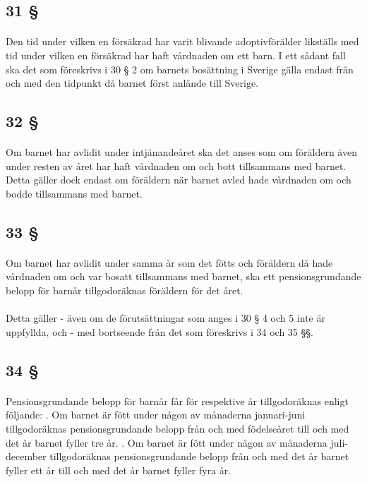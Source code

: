 \documentclass[a4paper,notitlepage,openany,10pt]{book}
\begin{document}
\subsection*{31 §}
\paragraph*{}
Den tid under vilken en försäkrad har varit blivande adoptivförälder likställs med tid under vilken en försäkrad har haft vårdnaden om ett barn. I ett sådant fall ska det som föreskrivs i 30 § 2 om barnets bosättning i Sverige gälla endast från och med den tidpunkt då barnet först anlände till Sverige.
\subsection*{32 §}
\paragraph*{}
Om barnet har avlidit under intjänandeåret ska det anses som om föräldern även under resten av året har haft vårdnaden om och bott tillsammans med barnet. Detta gäller dock endast om föräldern när barnet avled hade vårdnaden om och bodde tillsammans med barnet.
\subsection*{33 §}
\paragraph*{}
Om barnet har avlidit under samma år som det fötts och föräldern då hade vårdnaden om och var bosatt tillsammans med barnet, ska ett pensionsgrundande belopp för barnår tillgodoräknas föräldern för det året.
\paragraph*{}
Detta gäller
\newline - även om de förutsättningar som anges i 30 § 4 och 5 inte är uppfyllda, och
\newline - med bortseende från det som föreskrivs i 34 och 35 §§.
\subsection*{34 §}
\paragraph*{}
Pensionsgrundande belopp för barnår får för respektive år tillgodoräknas enligt följande:
. Om barnet är fött under någon av månaderna januari-juni tillgodoräknas pensionsgrundande belopp från och med födelseåret till och med det år barnet fyller tre år.
. Om barnet är fött under någon av månaderna juli-december tillgodoräknas pensionsgrundande belopp från och med det år barnet fyller ett år till och med det år barnet fyller fyra år.
\end{document}
